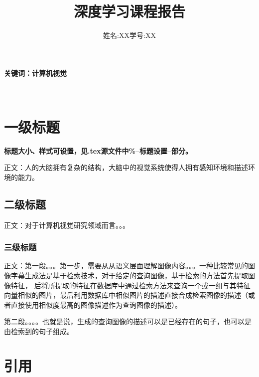\documentclass{template} %
\begin{document}
\title{\bf{\kaiti 深度学习课程报告}}
\author{姓名:XX\hspace{1cm}学号:XX}
\date{}
\maketitle

\paragraph{\bf{ \kaiti 关键词：计算机视觉}}
\paragraph{\\}

\section{一级标题}
\textbf{标题大小、样式可设置，见.tex源文件中\%--标题设置--部分。}

  正文：人的大脑拥有复杂的结构，大脑中的视觉系统使得人拥有感知环境和描述环境的能力。

\subsection{二级标题}
正文：对于计算机视觉研究领域而言。。。
\subsubsection{三级标题}
正文：第一段。。。第一步，需要从从语义层面理解图像内容。。。一种比较常见的图像字幕生成法是基于检索技术，对于给定的查询图像，基于检索的方法首先提取图像特征，
后将所提取的特征在数据库中通过检索方法来查询一个或一组与其特征向量相似的图片，最后利用数据库中相似图片的描述直接合成检索图像的描述（或者直接使用相似度最高的图像描述作为查询图像的描述）。
  
  第二段。。。。也就是说，生成的查询图像的描述可以是已经存在的句子，也可以是由检索到的句子组成。

\section{引用}
\end{document}
